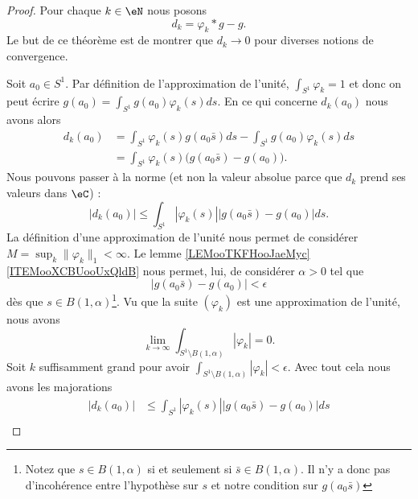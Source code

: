 \begin{proof}
	Pour chaque \( k\in \eN\) nous posons
	\begin{equation}
		d_k=\varphi_k*g-g.
	\end{equation}
	Le but de ce théorème est de montrer que \( d_k\to 0\) pour diverses notions de convergence.

	Soit \( a_0\in S^1\). Par définition de l'approximation de l'unité, \( \int_{S^1}\varphi_k=1\) et donc on peut écrire \( g(a_0)=\int_{S^1}g(a_0)\varphi_k(s)ds\). En ce qui concerne \( d_k(a_0)\) nous avons alors
	\begin{subequations}
		\begin{align}
			d_k(a_0) & =\int_{S^1}\varphi_k(s)g(a_0\bar s)ds-\int_{S^1}g(a_0)\varphi_k(s)ds \\
			         & =\int_{S^1}\varphi_k(s)\big( g(a_0\bar s)-g(a_0) \big).
		\end{align}
	\end{subequations}
	Nous pouvons passer à la norme (et non la valeur absolue parce que \( d_k\) prend ses valeurs dans \( \eC\)) :
	\begin{equation}
		| d_k(a_0) |\leq \int_{S^1}| \varphi_k(s) |\big| g(a_0\bar s)-g(a_0) \big|ds.
	\end{equation}
	La définition d'une approximation de l'unité nous permet de considérer \( M=\sup_k\| \varphi_k \|_1<\infty\). Le lemme \ref{LEMooTKFHooJaeMyc}\ref{ITEMooXCBUooUxQldB} nous permet, lui, de considérer \( \alpha>0\) tel que
	\begin{equation}
		| g(a_0\bar s)-g(a_0) |<\epsilon
	\end{equation}
	dès que \( s\in B(1,\alpha)\)\footnote{Notez que \( s\in B(1,\alpha)\) si et seulement si \( \bar s\in B(1,\alpha)\). Il n'y a donc pas d'incohérence entre l'hypothèse sur \( s\) et notre condition sur \( g(a_0\bar s)\)}. Vu que la suite \( (\varphi_k)\) est une approximation de l'unité, nous avons
	\begin{equation}
		\lim_{k\to \infty}\int_{S^1\setminus B(1,\alpha)}| \varphi_k |=0.
	\end{equation}
	Soit \( k\) suffisamment grand pour avoir \( \int_{S^1\setminus B(1,\alpha)}| \varphi_k |<\epsilon\). Avec tout cela nous avons les majorations
	\begin{subequations}
		\begin{align}
			| d_k(a_0) | & \leq \int_{S^1}| \varphi_k(s) |\big| g(a_0\bar s)-g(a_0) \big|ds                                                                                                                                                     \\

\end{align}
\end{subequations}
\end{proof}
